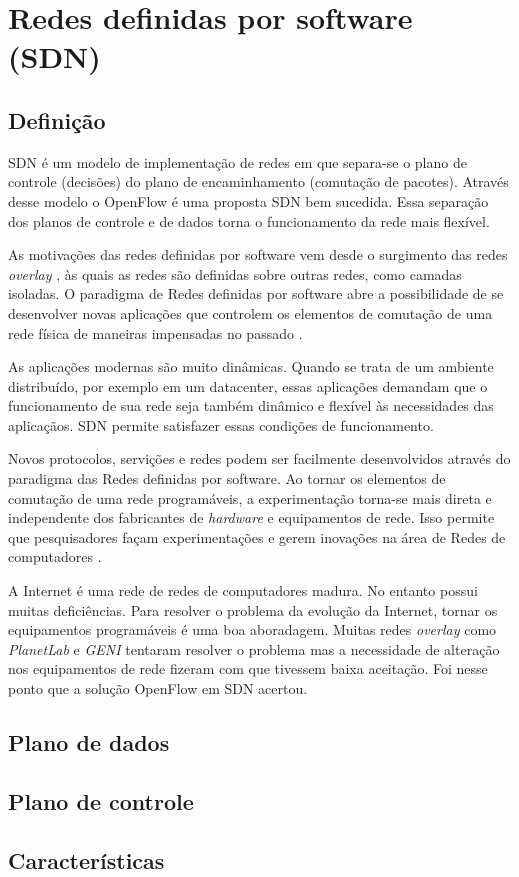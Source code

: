 \section{Redes definidas por software (SDN)}


\subsection{Definição}
SDN é um modelo de implementação de redes em que separa-se o plano de controle
(decisões) do plano de encaminhamento (comutação de pacotes). 
Através desse modelo o OpenFlow \citep{nick2008openflow} é uma proposta SDN 
bem sucedida. 
Essa separação dos planos de controle e de dados torna o funcionamento da
rede mais flexível.

As motivações das redes definidas por software vem desde o surgimento das 
redes \emph{overlay} \citep{clark2006overlay}, às quais as redes são definidas
sobre outras redes, como camadas isoladas.
O paradigma de Redes definidas por software abre a possibilidade de se 
desenvolver novas aplicações que controlem os elementos de comutação de uma
rede física de maneiras impensadas no passado \citep{guedes2012redes}.

As aplicações modernas são muito dinâmicas. 
Quando se trata de um ambiente distribuído, por exemplo em um datacenter, 
essas aplicações demandam que o funcionamento de sua rede seja também 
dinâmico e flexível às necessidades das aplicaçãos. 
SDN permite satisfazer essas condições de funcionamento. 

Novos protocolos, servições e redes podem ser facilmente desenvolvidos através
do paradigma das Redes definidas por software.
Ao tornar os elementos de comutação de uma rede programáveis, a 
experimentação torna-se mais direta e independente dos fabricantes de 
\emph{hardware} e equipamentos de rede. 
Isso permite que pesquisadores façam experimentações e gerem inovações 
na área de Redes de computadores \citep{nick2008openflow}.

A Internet é uma rede de redes de computadores madura. 
No entanto possui muitas deficiências. 
Para resolver o problema da evolução da Internet, tornar os equipamentos 
programáveis é uma boa aboradagem. 
Muitas redes \emph{overlay} como \emph{PlanetLab} 
\citep{peterson2006experiences} e \emph{GENI} \citep{berman2014geni} tentaram
resolver o problema mas a necessidade de alteração nos equipamentos de rede
fizeram com que tivessem baixa aceitação.
Foi nesse ponto que a solução OpenFlow em SDN acertou.


\subsection{Plano de dados}

\subsection{Plano de controle}


\subsection{Características}
